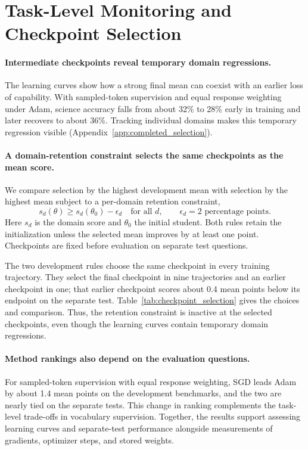 \section{Task-Level Monitoring and Checkpoint Selection}
\label{sec:recipe}

\paragraph{Intermediate checkpoints reveal temporary domain regressions.}
The learning curves show how a strong final mean can coexist with an earlier loss of capability. With sampled-token supervision and equal response weighting under Adam, science accuracy falls from about 32\% to 28\% early in training and later recovers to about 36\%. Tracking individual domains makes this temporary regression visible (Appendix~\ref{app:completed_selection}).

\paragraph{A domain-retention constraint selects the same checkpoints as the mean score.}
We compare selection by the highest development mean with selection by the highest mean subject to a per-domain retention constraint,
\begin{equation}
s_d(\theta)\geq s_d(\theta_0)-\epsilon_d\quad\text{for all }d,
\qquad \epsilon_d=2\text{ percentage points}.
\label{eq:retention}
\end{equation}
Here $s_d$ is the domain score and $\theta_0$ the initial student. Both rules retain the initialization unless the selected mean improves by at least one point. Checkpoints are fixed before evaluation on separate test questions.

The two development rules choose the same checkpoint in every training trajectory. They select the final checkpoint in nine trajectories and an earlier checkpoint in one; that earlier checkpoint scores about 0.4 mean points below its endpoint on the separate test. Table~\ref{tab:checkpoint_selection} gives the choices and comparison. Thus, the retention constraint is inactive at the selected checkpoints, even though the learning curves contain temporary domain regressions.

\paragraph{Method rankings also depend on the evaluation questions.}
For sampled-token supervision with equal response weighting, SGD leads Adam by about 1.4 mean points on the development benchmarks, and the two are nearly tied on the separate tests. This change in ranking complements the task-level trade-offs in vocabulary supervision. Together, the results support assessing learning curves and separate-test performance alongside measurements of gradients, optimizer steps, and stored weights.
